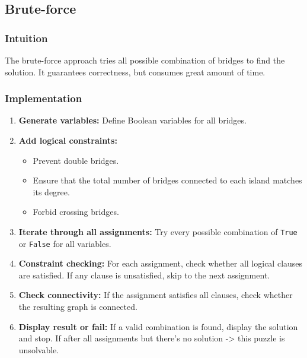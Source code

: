 \subsection{Brute-force}

\subsubsection{Intuition}
The brute-force approach tries all possible combination of bridges to find the solution.
It guarantees correctness, but consumes great amount of time.

\subsubsection{Implementation}

\begin{enumerate}
  \item \textbf{Generate variables:} Define Boolean variables for all bridges.

  \item \textbf{Add logical constraints:}
  \begin{itemize}
    \item Prevent double bridges.
    \item Ensure that the total number of bridges connected to each island matches its degree.
    \item Forbid crossing bridges.
  \end{itemize}

  \item \textbf{Iterate through all assignments:}
  Try every possible combination of \texttt{True} or \texttt{False} for all variables.

  \item \textbf{Constraint checking:}
  For each assignment, check whether all logical clauses are satisfied. If any clause is unsatisfied, skip to the next assignment.

  \item \textbf{Check connectivity:}
  If the assignment satisfies all clauses, check whether the resulting graph is connected.

  \item \textbf{Display result or fail:}
  If a valid combination is found, display the solution and stop. If after all assignments but there's no solution -> this puzzle is unsolvable.
\end{enumerate}